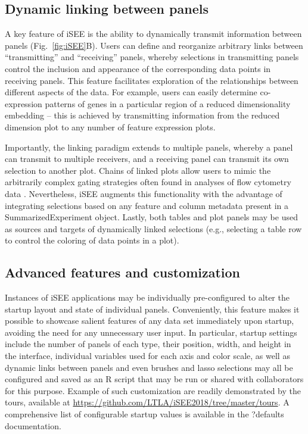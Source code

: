 \documentclass[10pt,a4paper,twocolumn]{article}
\begin{document}
\subsection*{Dynamic linking between panels}
A key feature of iSEE is the ability to dynamically transmit information between panels (Fig.~\ref{fig:iSEE}B).
Users can define and reorganize arbitrary links between ``transmitting'' and ``receiving'' panels, whereby selections in transmitting panels control the inclusion and appearance of the corresponding data points in receiving panels.
This feature facilitates exploration of the relationships between different aspects of the data.
For example, users can easily determine co-expression patterns of genes in a particular region of a reduced dimensionality embedding -- this is achieved by transmitting information from the reduced dimension plot to any number of feature expression plots.

Importantly, the linking paradigm extends to multiple panels, whereby a panel can transmit to multiple receivers, and a receiving panel can transmit its own selection to another plot.
Chains of linked plots allow users to mimic the arbitrarily complex gating strategies often found in analyses of flow cytometry data \citep{finak2014opencyto}.
Nevertheless, iSEE augments this functionality with the advantage of integrating selections based on any feature and column metadata present in a SummarizedExperiment object.
Lastly, both tables and plot panels may be used as sources and targets of dynamically linked selections (e.g., selecting a table row to control the coloring of data points in a plot).

\subsection*{Advanced features and customization}

Instances of iSEE applications may be individually pre-configured to alter the startup layout and state of individual panels.
Conveniently, this feature makes it possible to showcase salient features of any data set immediately upon startup, avoiding the need for any unnecessary user input.
In particular, startup settings include the number of panels of each type, their position, width, and height in the interface, individual variables used for each axis and color scale, as well as dynamic links between panels and even brushes and lasso selections may all be configured and saved as an R script that may be run or shared with collaborators for this purpose.
Example of such customization are readily demonstrated by the tours, available at
\url{https://github.com/LTLA/iSEE2018/tree/master/tours}. %
A comprehensive list of configurable startup values is available in the ?defaults documentation.
\end{document}

